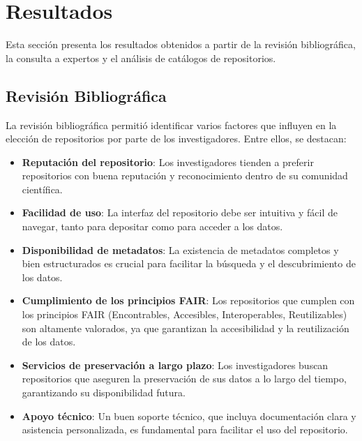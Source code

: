 \documentclass[runningheads]{llncs}
\begin{document}
\section{Resultados}

Esta sección presenta los resultados obtenidos a partir de la revisión bibliográfica, la consulta a expertos y el análisis de catálogos de repositorios.

\subsection{Revisión Bibliográfica}

La revisión bibliográfica permitió identificar varios factores que influyen en la elección de repositorios por parte de los investigadores. Entre ellos, se destacan:
\begin{itemize}
    \item \textbf{Reputación del repositorio}: Los investigadores tienden a preferir repositorios con buena reputación y reconocimiento dentro de su comunidad científica.
    \item \textbf{Facilidad de uso}: La interfaz del repositorio debe ser intuitiva y fácil de navegar, tanto para depositar como para acceder a los datos.
    \item \textbf{Disponibilidad de metadatos}: La existencia de metadatos completos y bien estructurados es crucial para facilitar la búsqueda y el descubrimiento de los datos.
    \item \textbf{Cumplimiento de los principios FAIR}: Los repositorios que cumplen con los principios FAIR (Encontrables, Accesibles, Interoperables, Reutilizables) son altamente valorados, ya que garantizan la accesibilidad y la reutilización de los datos.
    \item \textbf{Servicios de preservación a largo plazo}: Los investigadores buscan repositorios que aseguren la preservación de sus datos a lo largo del tiempo, garantizando su disponibilidad futura.
    \item \textbf{Apoyo técnico}: Un buen soporte técnico, que incluya documentación clara y asistencia personalizada, es fundamental para facilitar el uso del repositorio.
\end{itemize}
\end{document}
